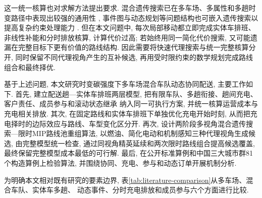 这一统一核算也对求解方法提出要求.
混合遗传搜索已在多车场、多属性和多趟时变路径中表现出较强的通用性
\cite{ref:76,ref:77,ref:91},
事件图与动态规划等问题结构也可嵌入遗传搜索以提高复杂约束处理能力
\cite{ref:95}.
但在本文问题中, 每次局部移动都立即完成实体车排班、非线性补能和分时排放核算,
计算代价过高; 若始终用同一简化代价搜索,
又可能遗漏在完整目标下更有价值的路线结构.
因此需要将快速代理搜索与统一完整核算分开,
同时保留不同代理视角产生的互补候选,
再用受时限约束的数学规划完成路线组合和最终择优.

基于上述问题, 本文研究时变碳强度下多车场混合车队动态协同配送,
主要工作如下.
首先, 建立配送趟—实体车排班两层模型,
把有限车队、多趟衔接、趟间充电、客户责任、成员参与和滚动状态继承
纳入同一可执行方案, 并统一核算运营成本与充电相关排放.
其次, 在固定路线和实体车排班下单独优化充电开始时刻,
从而把充电择时的边际效应与路线、车型变化区分开.
再次, 设计两阶段多视角混合遗传搜索—限时MIP路线池重组算法,
以燃油、简化电动和机制感知三种代理视角生成候选,
由完整模型统一检查, 通过同视角精英延续和两次限时路线组合提高候选覆盖,
最终保留完整模型成本最低的可行解.
最后, 在公开标准算例和中国三大城市群81个构造算例上检验算法,
并围绕协同、充电、参与和动态订单开展机制分析.

为明确本文相对既有研究的要素边界,
表\ref{tab:literature-comparison}从多车场、混合车队、实体车多趟、
动态事件、分时充电排放和成员参与六个方面进行比较.

